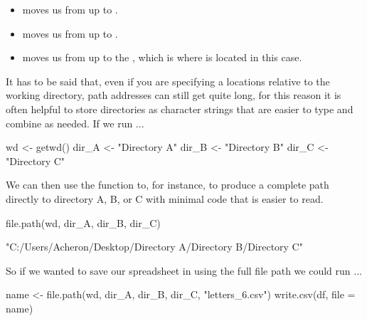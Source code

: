 \begin{itemize}
    \item {} moves us from  up to .
    \item {} moves us from  up to .
    \item {} moves us from  up to the , which is where  is located in this case.
\end{itemize}

It has to be said that, even if you are specifying a locations relative to the working directory, path addresses can still get quite long, for this reason it is often helpful to store directories as character strings that are easier to type and combine as needed. If we run ...

\begin{inR}
wd <- getwd()
dir_A <- "Directory A"
dir_B <- "Directory B"
dir_C <- "Directory C"
\end{inR}

\medskip

\noindent
We can then use the  function to, for instance, to produce a complete path directly to directory A, B, or C with minimal code that is easier to read.

\begin{inR}
file.path(wd, dir_A, dir_B, dir_C)
\end{inR}

\begin{outR}
"C:/Users/Acheron/Desktop/Directory A/Directory B/Directory C" 
\end{outR}

\noindent
So if we wanted to save our spreadsheet in  using the full file path we could run ...

\begin{inR}
name <- file.path(wd, dir_A, dir_B, dir_C, "letters_6.csv")
write.csv(df, file = name)
\end{inR}

\vspace{2em}

